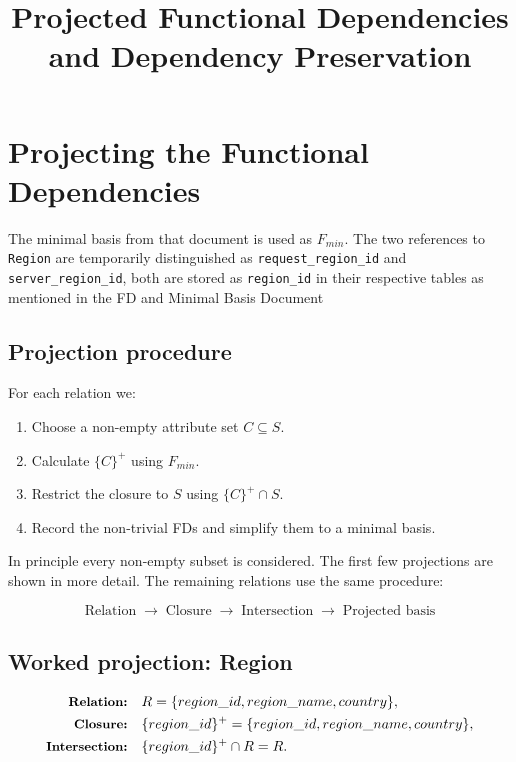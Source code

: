 \documentclass[11pt]{article}
\title{Projected Functional Dependencies and Dependency Preservation}
\author{}
\date{}
\newcommand{\code}[1]{\texttt{#1}}
\newcommand{\projlabel}[1]{\text{\small\bfseries #1}}
\begin{document}
\maketitle

\setcounter{section}{4}

\section{Projecting the Functional Dependencies}

The minimal basis from that document is used as $F_{min}$. The two references to
\code{Region} are temporarily distinguished as \code{request\_region\_id} and
\code{server\_region\_id}, both are stored as \code{region\_id} in their respective tables as mentioned in the FD and Minimal Basis Document

\subsection{Projection procedure}

For each relation we:

\begin{enumerate}
    \item Choose a non-empty attribute set $C \subseteq S$.
    \item Calculate $\{C\}^{+}$ using $F_{min}$.
    \item Restrict the closure to $S$ using $\{C\}^{+} \cap S$.
    \item Record the non-trivial FDs and simplify them to a minimal basis.
\end{enumerate}

In principle every non-empty subset is considered. The first few projections are shown in
more detail. The remaining relations use the same procedure:

\[
\boxed{\text{Relation} \;\longrightarrow\; \text{Closure} \;\longrightarrow\;
\text{Intersection} \;\longrightarrow\; \text{Projected basis}}
\]

\subsection{Worked projection: Region}

\begin{align*}
\projlabel{Relation:} &\quad R = \{region\_id, region\_name, country\},\\
\projlabel{Closure:} &\quad \{region\_id\}^{+}
= \{region\_id, region\_name, country\},\\
\projlabel{Intersection:} &\quad \{region\_id\}^{+} \cap R = R.
\end{align*}
\end{document}

